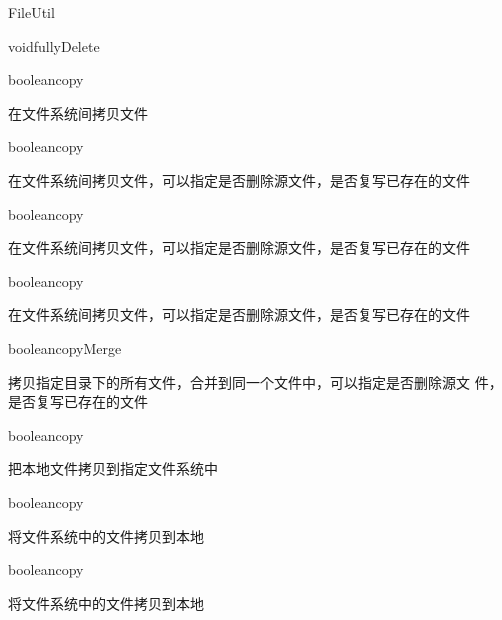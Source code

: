 \begin{XeClass}{FileUtil}
\begin{XeMethod}{\XePublic}{void}{fullyDelete}
    \end{XeMethod}

    \begin{XeMethod}{\XePublic}{boolean}{copy}
         
 在文件系统间拷贝文件

    \end{XeMethod}

    \begin{XeMethod}{\XePublic}{boolean}{copy}
         
 在文件系统间拷贝文件，可以指定是否删除源文件，是否复写已存在的文件

    \end{XeMethod}

    \begin{XeMethod}{\XePublic}{boolean}{copy}
         
 在文件系统间拷贝文件，可以指定是否删除源文件，是否复写已存在的文件

    \end{XeMethod}

    \begin{XeMethod}{\XePrivate}{boolean}{copy}
         
 在文件系统间拷贝文件，可以指定是否删除源文件，是否复写已存在的文件

    \end{XeMethod}

    \begin{XeMethod}{\XePublic}{boolean}{copyMerge}
         
 拷贝指定目录下的所有文件，合并到同一个文件中，可以指定是否删除源文
 件，是否复写已存在的文件

    \end{XeMethod}

    \begin{XeMethod}{\XePublic}{boolean}{copy}
         
 把本地文件拷贝到指定文件系统中

    \end{XeMethod}

    \begin{XeMethod}{\XePublic}{boolean}{copy}
         
 将文件系统中的文件拷贝到本地

    \end{XeMethod}

    \begin{XeMethod}{\XePrivate}{boolean}{copy}
         
 将文件系统中的文件拷贝到本地


\end{XeMethod}
\end{XeClass}
